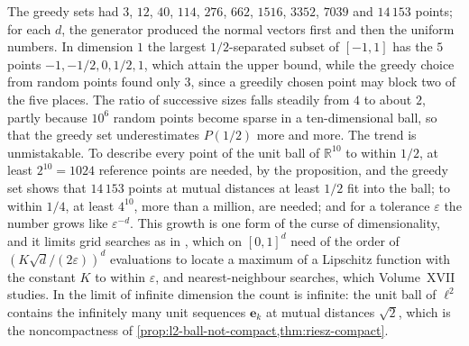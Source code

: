 \begin{figure}
\end{figure}

The greedy sets had $3$, $12$, $40$, $114$, $276$, $662$, $1516$, $3352$, $7039$ and $14\,153$ points; for each $d$, the generator produced the normal vectors first and then the uniform numbers. In dimension $1$ the largest $1/2$-separated subset of $[-1,1]$ has the $5$ points $-1,-1/2,0,1/2,1$, which attain the upper bound, while the greedy choice from random points found only $3$, since a greedily chosen point may block two of the five places. The ratio of successive sizes falls steadily from $4$ to about $2$, partly because $10^6$ random points become sparse in a ten-dimensional ball, so that the greedy set underestimates $P(1/2)$ more and more. The trend is unmistakable. To describe every point of the unit ball of $\mathbb R^{10}$ to within $1/2$, at least $2^{10}=1024$ reference points are needed, by the proposition, and the greedy set shows that $14\,153$ points at mutual distances at least $1/2$ fit into the ball; to within $1/4$, at least $4^{10}$, more than a million, are needed; and for a tolerance $\varepsilon$ the number grows like $\varepsilon^{-d}$. This growth is one form of the curse of dimensionality, and it limits grid searches as in , which on $[0,1]^d$ need of the order of $(K\sqrt d/(2\varepsilon))^d$ evaluations to locate a maximum of a Lipschitz function with the constant $K$ to within $\varepsilon$, and nearest-neighbour searches, which Volume~XVII studies. In the limit of infinite dimension the count is infinite: the unit ball of $\ell^2$ contains the infinitely many unit sequences $\mathbf e_k$ at mutual distances $\sqrt2$, which is the noncompactness of \cref{prop:l2-ball-not-compact,thm:riesz-compact}.

